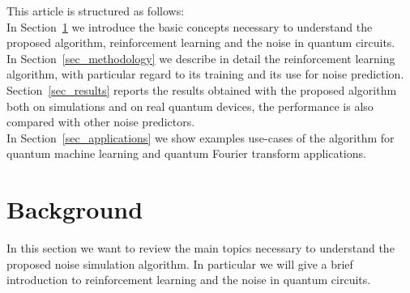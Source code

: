 \documentclass[referee,sn-basic]{sn-jnl} %
\begin{document}
\noindent
This article is structured as follows:\\
In Section~\ref{sec_background} we introduce the basic concepts necessary to understand the proposed algorithm, reinforcement learning and the noise in quantum circuits. \\
In Section~\ref{sec_methodology} we describe in detail the reinforcement learning algorithm, with particular regard to its training and its use for noise prediction. \\
Section~\ref{sec_results} reports the results obtained with the proposed algorithm both on simulations and on real quantum devices, the performance is also compared with other noise predictors. \\
In Section~\ref{sec_applications} we show examples use-cases of the algorithm for quantum machine learning and quantum Fourier transform applications.

\section{Background}\label{sec_background}
In this section we want to review the main topics necessary to understand the proposed noise simulation algorithm.
In particular we will give a brief introduction to reinforcement learning and the noise in quantum circuits.
\end{document}
